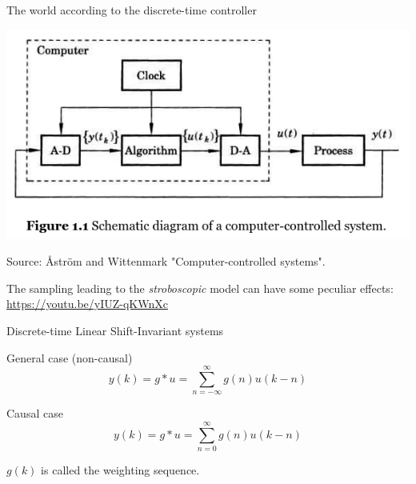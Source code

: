 \documentclass[presentation,aspectratio=169]{beamer}
\begin{document}
\begin{frame}[label={sec:orgb9e1af2}]{The world according to the discrete-time controller}
\small 
\begin{center}
\includegraphics[width=0.6\linewidth]{../../figures/fig1-1-schematic.png}

Source: Åström and Wittenmark "Computer-controlled systems".
\end{center}

\pause

The sampling leading to the \emph{stroboscopic} model can have some peculiar effects: \url{https://youtu.be/yIUZ-qKWnXc}
\end{frame}

\begin{frame}[label={sec:org7afec88}]{Discrete-time Linear Shift-Invariant systems}
\begin{center}
\end{center}

\pause

\begin{block}{General case (non-causal)}
\[ y(k) = g \ast u = \sum_{n=-\infty}^\infty g(n) u(k-n) \]

\pause
\end{block}

\begin{block}{Causal case}
\[ y(k) = g \ast u = \sum_{n=0}^\infty g(n) u(k-n) \]


\(g(k)\) is called the \alert{weighting sequence}.
\end{block}
\end{frame}
\end{document}
